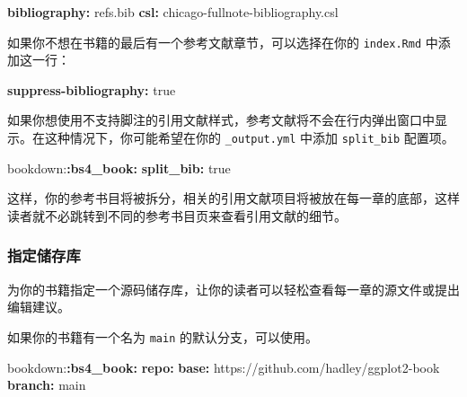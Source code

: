 \documentclass[
  12pt,
]{krantz}
\newenvironment{Shaded}{\begin{snugshade}}{\end{snugshade}}
\newcommand{\AttributeTok}[1]{\textcolor[rgb]{0.13,0.29,0.53}{#1}}
\newcommand{\CharTok}[1]{\textcolor[rgb]{0.31,0.60,0.02}{#1}}
\newcommand{\FunctionTok}[1]{\textcolor[rgb]{0.13,0.29,0.53}{\textbf{#1}}}
\newcommand{\KeywordTok}[1]{\textcolor[rgb]{0.13,0.29,0.53}{\textbf{#1}}}
\theoremstyle{definition}
\theoremstyle{definition}
\theoremstyle{definition}
\theoremstyle{definition}
\theoremstyle{remark}
\begin{document}
\begin{Shaded}
\begin{Highlighting}[]
\FunctionTok{bibliography}\KeywordTok{:}\AttributeTok{ refs.bib}
\FunctionTok{csl}\KeywordTok{:}\AttributeTok{ chicago{-}fullnote{-}bibliography.csl}
\end{Highlighting}
\end{Shaded}

如果你不想在书籍的最后有一个参考文献章节，可以选择在你的 \texttt{index.Rmd} 中添加这一行：

\begin{Shaded}
\begin{Highlighting}[]
\FunctionTok{suppress{-}bibliography}\KeywordTok{:}\AttributeTok{ }\CharTok{true}
\end{Highlighting}
\end{Shaded}

如果你想使用不支持脚注的引用文献样式，参考文献将不会在行内弹出窗口中显示。在这种情况下，你可能希望在你的 \texttt{\_output.yml} 中添加 \texttt{split\_bib} 配置项。

\begin{Shaded}
\begin{Highlighting}[]
\AttributeTok{bookdown:}\FunctionTok{:bs4\_book}\KeywordTok{:}
\AttributeTok{  }\FunctionTok{split\_bib}\KeywordTok{:}\AttributeTok{ }\CharTok{true}
\end{Highlighting}
\end{Shaded}

这样，你的参考书目将被拆分，相关的引用文献项目将被放在每一章的底部，这样读者就不必跳转到不同的参考书目页来查看引用文献的细节。

\hypertarget{ux6307ux5b9aux50a8ux5b58ux5e93}{%
\subsubsection{指定储存库}\label{ux6307ux5b9aux50a8ux5b58ux5e93}}

为你的书籍指定一个源码储存库，让你的读者可以轻松查看每一章的源文件或提出编辑建议。

如果你的书籍有一个名为 \texttt{main} 的默认分支，可以使用。

\begin{Shaded}
\begin{Highlighting}[]
\AttributeTok{bookdown:}\FunctionTok{:bs4\_book}\KeywordTok{:}
\AttributeTok{  }\FunctionTok{repo}\KeywordTok{:}
\AttributeTok{    }\FunctionTok{base}\KeywordTok{:}\AttributeTok{ https://github.com/hadley/ggplot2{-}book}
\AttributeTok{    }\FunctionTok{branch}\KeywordTok{:}\AttributeTok{ main}
\end{Highlighting}
\end{Shaded}
\end{document}
